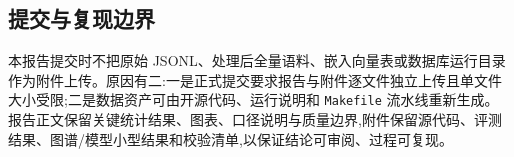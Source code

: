 \subsection{提交与复现边界}

本报告提交时不把原始 JSONL、处理后全量语料、嵌入向量表或数据库运行目录作为附件上传。原因有二:一是正式提交要求报告与附件逐文件独立上传且单文件大小受限;二是数据资产可由开源代码、运行说明和 \texttt{Makefile} 流水线重新生成。报告正文保留关键统计结果、图表、口径说明与质量边界,附件保留源代码、评测结果、图谱/模型小型结果和校验清单,以保证结论可审阅、过程可复现。

\clearpage
